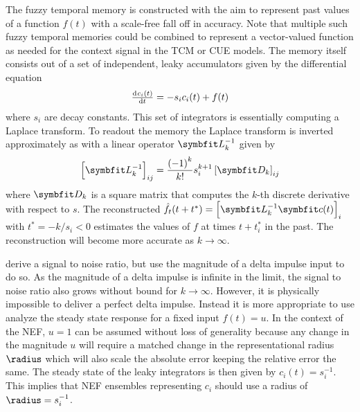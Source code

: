 The fuzzy temporal memory is constructed with the aim to represent past values of a function $f(t)$ with a scale-free fall off in accuracy.
Note that multiple such fuzzy temporal memories could be combined to represent a vector-valued function as needed for the context signal in the TCM or CUE models.
The memory itself consists out of a set of independent, leaky accumulators given by the differential equation
\begin{equation}
    \od{c_i(t)}{t} = - s_i c_i(t) + f(t)
\end{equation}
where $s_i$ are decay constants.
This set of integrators is essentially computing a Laplace transform.
To readout the memory the Laplace transform is inverted approximately as with a linear operator $\mat L_k^{-1}$ given by
\begin{equation}
    \sbr{\mat L_k^{-1}}_{ij} = \frac{{(-1)}^k}{k!} s_i^{k+1} \sbr{\mat D_k}_{ij}
\end{equation}
where $\mat D_k$ is a square matrix that computes the $k$-th discrete derivative with respect to $s$.
The reconstructed $\hat{f}_t(t + t^*) = \sbr{\mat L_k^{-1} \vc c(t)}_i$ with $t^* = -k/s_i < 0$ estimates the values of $f$ at times $t + t_i^*$ in the past.
The reconstruction will become more accurate as $k \rightarrow \infty$.

\Textcite{shankar2013} derive a signal to noise ratio, but use the magnitude of a delta impulse input to do so.
As the magnitude of a delta impulse is infinite in the limit, the signal to noise ratio also grows without bound for $k \rightarrow \infty$.
However, it is physically impossible to deliver a perfect delta impulse.
Instead it is more appropriate to use analyze the steady state response for a fixed input $f(t) = u$.
In the context of the NEF, $u=1$ can be assumed without loss of generality because any change in the magnitude $u$ will require a matched change in the representational radius $\radius$ which will also scale the absolute error keeping the relative error the same.
The steady state of the leaky integrators is then given by $c_i(t) = s_i^{-1}$.
This implies that NEF ensembles representing $c_i$ should use a radius of $\radius = s_i^{-1}$.


